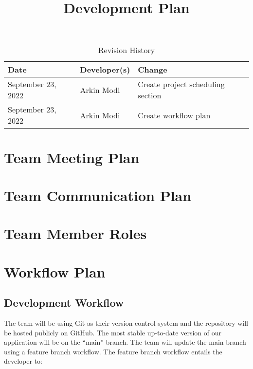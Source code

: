 \documentclass{article}
\title{Development Plan\\\progname}
\author{\authname}
\date{}
\begin{document}
\begin{table}[hp]
\caption{Revision History} \label{TblRevisionHistory}
\begin{tabularx}{\textwidth}{llX}
\toprule
\textbf{Date} & \textbf{Developer(s)} & \textbf{Change}\\
\midrule
September 23, 2022 & Arkin Modi & Create project scheduling section\\
September 23, 2022 & Arkin Modi & Create workflow plan\\
\bottomrule
\end{tabularx}
\end{table}

\newpage

\maketitle


\section{Team Meeting Plan}

\section{Team Communication Plan}

\section{Team Member Roles}

\section{Workflow Plan}


\subsection{Development Workflow}

The team will be using Git as their version control system and the repository will be hosted
publicly on GitHub. The most stable up-to-date version of our application will be on the ``main''
branch. The team will update the main branch using a feature branch workflow. The feature branch
workflow entails the developer to:
\end{document}
